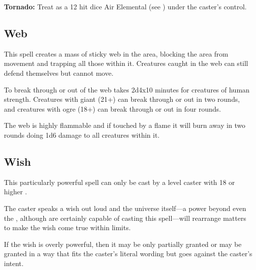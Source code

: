 \begin{multicols*}{2}
\textbf{Tornado:} Treat as a 12 hit dice Air Elemental (see ) under the caster’s control.

\subsection{Web}\label{spell:Web}

This spell creates a mass of sticky web in the area, blocking the area from movement and trapping all those within it. Creatures caught in the web can still defend themselves but cannot move.

To break through or out of the web takes 2d4x10 minutes for creatures of human strength. Creatures with giant  (21+) can break through or out in two rounds, and creatures with ogre  (18+) can break through or out in four rounds.

The web is highly flammable and if touched by a flame it will burn away in two rounds doing 1d6 damage to all creatures within it.

\subsection{Wish}\label{spell:Wish}

This particularly powerful spell can only be cast by a  level caster with 18 or higher .

The caster speaks a wish out loud and the universe itself—a power beyond even the , although  are certainly capable of casting this spell—will rearrange matters to make the wish come true within limits.

If the wish is overly powerful, then it may be only partially granted or may be granted in a way that fits the caster’s literal wording but goes against the caster’s intent.


\end{multicols*}
